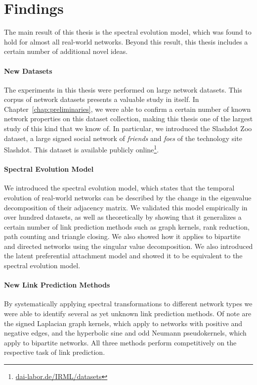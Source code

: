 \documentclass[11pt,a4paper]{book}
\begin{document}
\section{Findings}
The main result of this thesis is the spectral evolution model, which
was found to hold for almost all real-world networks.  Beyond this
result, this thesis includes a certain number of additional novel
ideas. 

\paragraph{New Datasets}
The experiments in this thesis were performed on large network
datasets.  This corpus of network datasets presents a valuable study
in itself.  In 
Chapter~\ref{chap:preliminaries}, we were able to confirm a certain
number of known network properties on this dataset collection, making this
thesis one of the largest study of this kind that we know of.
In particular, we introduced the Slashdot Zoo dataset, a large signed
social network of \emph{friends} and \emph{foes} of the technology site
Slashdot.  This dataset is available publicly
online\footnote{\href{http://dai-labor.de/IRML/datasets}{dai-labor.de/IRML/datasets}}. 

\paragraph{Spectral Evolution Model}
We introduced the spectral evolution model, which states that the
temporal evolution of real-world networks can be described by the
change in the eigenvalue decomposition of their adjacency matrix.  
We validated this model empirically in over hundred datasets, as well as
theoretically by showing that it generalizes a certain number of link
prediction methods such as graph kernels, rank reduction, path counting
and triangle closing. 
We also showed how it applies to bipartite and directed networks using
the singular value decomposition. 
We also introduced the latent preferential attachment model and showed
it to be equivalent to the spectral evolution model. 

\paragraph{New Link Prediction Methods}
By systematically applying
spectral transformations to different network types we were able to
identify several as yet unknown link prediction methods.  Of note are
the signed Laplacian graph kernels, which apply to networks with
positive and negative edges, and the hyperbolic sine and odd Neumann
pseudokernels, which apply to bipartite networks.  All three methods
perform competitively on the respective task of link prediction. 
\end{document}
